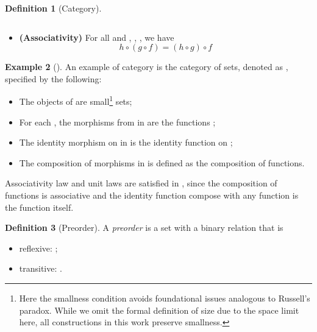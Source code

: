 \documentclass[12pt,a4paper]{report}
\theoremstyle{definition}
\newtheorem{definition}{Definition}[chapter]
\newtheorem{example}[definition]{Example}
\begin{document}
\begin{definition}[Category]
\begin{itemize}
\begin{equation}
                    \end{equation}
                \item
                    \textbf{(Associativity)}
                    For all  and , , , we have
                    \begin{equation} \label{law: associativity}
                        h \circ (g \circ f) = (h \circ g) \circ f
                    \end{equation}
            \end{itemize}
        \end{definition}

        \begin{example}[]
            An example of category is the category of sets, denoted as , specified by the following:
            \begin{itemize}
                \item 
                    The objects of  are small\footnote{Here the smallness condition avoids foundational issues analogous to Russell's paradox. While we omit the formal definition of size due to the space limit here, all constructions in this work preserve smallness.} sets;
                \item
                    For each , the morphisms from  in  are the functions ;
                \item
                    The identity morphism on  in  is the identity function on ;
                \item
                    The composition of morphisms in  is defined as the composition of functions.
            \end{itemize}
            Associativity law and unit laws are satisfied in , since the composition of functions is associative and the identity function compose with any function is the function itself.
        \end{example}

        \begin{definition}[Preorder]
            A \emph{preorder}  is a set  with a binary relation \text{\sqsubseteq} that is
            \begin{itemize}
                \item reflexive: ;
                \item transitive: .
            \end{itemize}
        \end{definition}
\end{document}
